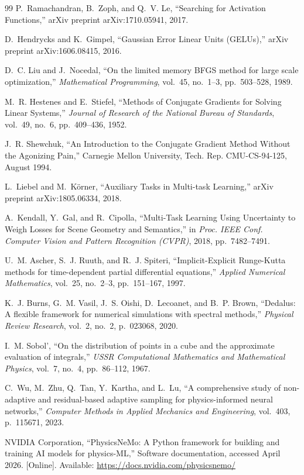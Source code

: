 \documentclass[10pt,journal,compsoc]{IEEEtran}
\begin{document}
\begin{thebibliography}{99}
P.~Ramachandran, B.~Zoph, and Q.~V. Le, ``Searching for Activation
Functions,'' arXiv preprint arXiv:1710.05941, 2017.

D.~Hendrycks and K.~Gimpel, ``Gaussian Error Linear Units (GELUs),''
arXiv preprint arXiv:1606.08415, 2016.


D.~C. Liu and J.~Nocedal, ``On the limited memory BFGS method for large
scale optimization,'' \emph{Mathematical Programming}, vol.~45, no.~1--3,
pp.~503--528, 1989.

M.~R. Hestenes and E.~Stiefel, ``Methods of Conjugate Gradients for
Solving Linear Systems,'' \emph{Journal of Research of the National
Bureau of Standards}, vol.~49, no.~6, pp.~409--436, 1952.

J.~R. Shewchuk, ``An Introduction to the Conjugate Gradient Method
Without the Agonizing Pain,'' Carnegie Mellon University, Tech. Rep.
CMU-CS-94-125, August 1994.


L.~Liebel and M.~K\"orner, ``Auxiliary Tasks in Multi-task Learning,''
arXiv preprint arXiv:1805.06334, 2018.

A.~Kendall, Y.~Gal, and R.~Cipolla, ``Multi-Task Learning Using Uncertainty
to Weigh Losses for Scene Geometry and Semantics,'' in \emph{Proc. IEEE
Conf. Computer Vision and Pattern Recognition (CVPR)}, 2018,
pp.~7482--7491.


U.~M. Ascher, S.~J. Ruuth, and R.~J. Spiteri, ``Implicit-Explicit
Runge-Kutta methods for time-dependent partial differential equations,''
\emph{Applied Numerical Mathematics}, vol.~25, no.~2--3, pp.~151--167,
1997.

K.~J. Burns, G.~M. Vasil, J.~S. Oishi, D.~Lecoanet, and B.~P. Brown,
``Dedalus: A flexible framework for numerical simulations with spectral
methods,'' \emph{Physical Review Research}, vol.~2, no.~2, p.~023068, 2020.

I.~M. Sobol', ``On the distribution of points in a cube and the approximate
evaluation of integrals,'' \emph{USSR Computational Mathematics and
Mathematical Physics}, vol.~7, no.~4, pp.~86--112, 1967.

C.~Wu, M.~Zhu, Q.~Tan, Y.~Kartha, and L.~Lu, ``A comprehensive study of
non-adaptive and residual-based adaptive sampling for physics-informed
neural networks,'' \emph{Computer Methods in Applied Mechanics and
Engineering}, vol.~403, p.~115671, 2023.


NVIDIA Corporation, ``PhysicsNeMo: A Python framework for building and
training AI models for physics-ML,'' Software documentation, accessed
April 2026. [Online]. Available: \url{https://docs.nvidia.com/physicsnemo/}

\end{thebibliography}

\end{document}
